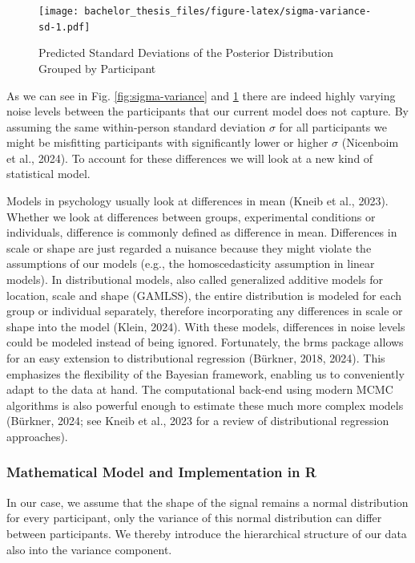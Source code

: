\documentclass[
  doc,12pt,floatsintext]{apa7}
\begin{document}
\begin{figure}
\centering
\texttt{[image: bachelor\_thesis\_files/figure-latex/sigma-variance-sd-1.pdf]}
\caption{\label{fig:sigma-variance-sd}Predicted Standard Deviations of the Posterior Distribution Grouped by Participant}
\end{figure}

As we can see in Fig. \ref{fig:sigma-variance} and \ref{fig:sigma-variance-sd} there are indeed highly varying noise levels between the participants that our current model does not capture. By assuming the same within-person standard deviation \(\sigma\) for all participants we might be misfitting participants with significantly lower or higher \(\sigma\) (Nicenboim et al., 2024). To account for these differences we will look at a new kind of statistical model.

Models in psychology usually look at differences in mean (Kneib et al., 2023). Whether we look at differences between groups, experimental conditions or individuals, difference is commonly defined as difference in mean. Differences in scale or shape are just regarded a nuisance because they might violate the assumptions of our models (e.g., the homoscedasticity assumption in linear models). In distributional models, also called generalized additive models for location, scale and shape (GAMLSS), the entire distribution is modeled for each group or individual separately, therefore incorporating any differences in scale or shape into the model (Klein, 2024). With these models, differences in noise levels could be modeled instead of being ignored. Fortunately, the brms package allows for an easy extension to distributional regression (Bürkner, 2018, 2024). This emphasizes the flexibility of the Bayesian framework, enabling us to conveniently adapt to the data at hand. The computational back-end using modern MCMC algorithms is also powerful enough to estimate these much more complex models (Bürkner, 2024; see Kneib et al., 2023 for a review of distributional regression approaches).

\subsubsection{Mathematical Model and Implementation in R}\label{mathematical-model-and-implementation-in-r-1}

In our case, we assume that the shape of the signal remains a normal distribution for every participant, only the variance of this normal distribution can differ between participants. We thereby introduce the hierarchical structure of our data also into the variance component.
\end{document}
